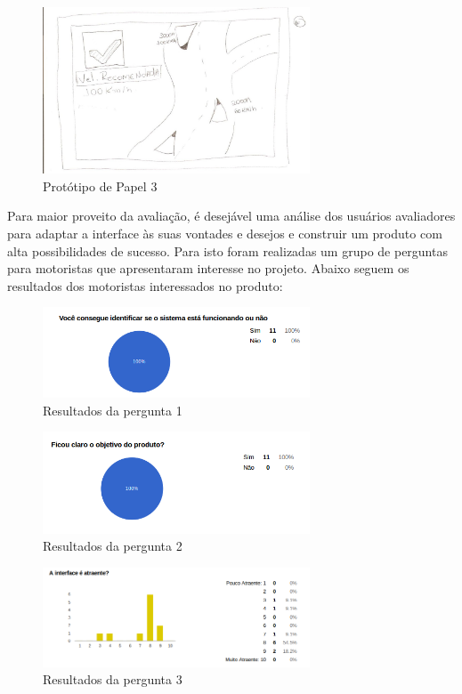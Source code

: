 \begin{figure}[!h]
  \centering
  \includegraphics[width=300px, scale=1]{figuras/prototipo3}
  \caption{Protótipo de Papel 3}
\label{fig:prototipo3}
\end{figure}

Para maior proveito da avaliação, é desejável uma análise dos usuários avaliadores para adaptar a interface às suas vontades e desejos e construir um produto com alta possibilidades de sucesso. Para isto foram realizadas um grupo de perguntas para motoristas que apresentaram interesse no projeto. Abaixo seguem os resultados dos motoristas interessados no produto:

\begin{figure}[!h]
  \centering
  \includegraphics[width=300px, scale=1]{figuras/result1}
  \caption{Resultados da pergunta 1}
\label{fig:result1}
\end{figure}


\begin{figure}[!h]
  \centering
  \includegraphics[width=300px, scale=1]{figuras/result2}
  \caption{Resultados da pergunta 2}
\label{fig:result2}
\end{figure}


\begin{figure}[!h]
  \centering
  \includegraphics[width=300px, scale=1]{figuras/result3}
  \caption{Resultados da pergunta 3}
\label{fig:result3}
\end{figure}


